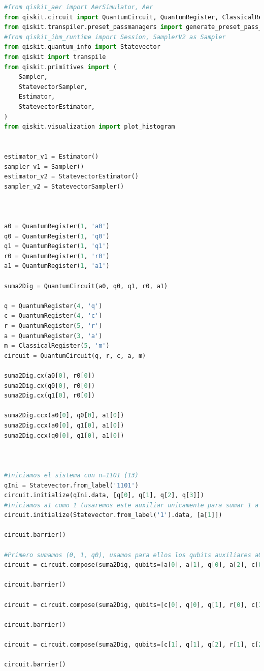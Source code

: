 \begin{lstlisting}[language=Python]
#from qiskit_aer import AerSimulator, Aer
from qiskit.circuit import QuantumCircuit, QuantumRegister, ClassicalRegister
from qiskit.transpiler.preset_passmanagers import generate_preset_pass_manager
#from qiskit_ibm_runtime import Session, SamplerV2 as Sampler
from qiskit.quantum_info import Statevector
from qiskit import transpile
from qiskit.primitives import (
    Sampler,
    StatevectorSampler,
    Estimator,
    StatevectorEstimator,
)
from qiskit.visualization import plot_histogram


estimator_v1 = Estimator()
sampler_v1 = Sampler()
estimator_v2 = StatevectorEstimator()
sampler_v2 = StatevectorSampler()



a0 = QuantumRegister(1, 'a0')
q0 = QuantumRegister(1, 'q0')
q1 = QuantumRegister(1, 'q1')
r0 = QuantumRegister(1, 'r0')
a1 = QuantumRegister(1, 'a1')

suma2Dig = QuantumCircuit(a0, q0, q1, r0, a1)

q = QuantumRegister(4, 'q')
c = QuantumRegister(4, 'c')
r = QuantumRegister(5, 'r')
a = QuantumRegister(3, 'a')
m = ClassicalRegister(5, 'm')
circuit = QuantumCircuit(q, r, c, a, m)

suma2Dig.cx(a0[0], r0[0])
suma2Dig.cx(q0[0], r0[0])
suma2Dig.cx(q1[0], r0[0])

suma2Dig.ccx(a0[0], q0[0], a1[0])
suma2Dig.ccx(a0[0], q1[0], a1[0])
suma2Dig.ccx(q0[0], q1[0], a1[0])



#Iniciamos el sistema con n=1101 (13)
qIni = Statevector.from_label('1101')
circuit.initialize(qIni.data, [q[0], q[1], q[2], q[3]])
#Iniciamos a1 como 1 (usaremos este auxiliar unicamente para sumar 1 a q0 inicialmente). Esto se puede optimizar
circuit.initialize(Statevector.from_label('1').data, [a[1]])

circuit.barrier()

#Primero sumamos (0, 1, q0), usamos para ellos los qubits auxiliares a0 y a1 (establecidos en )
circuit = circuit.compose(suma2Dig, qubits=[a[0], a[1], q[0], a[2], c[0]])

circuit.barrier()

circuit = circuit.compose(suma2Dig, qubits=[c[0], q[0], q[1], r[0], c[1]])

circuit.barrier()

circuit = circuit.compose(suma2Dig, qubits=[c[1], q[1], q[2], r[1], c[2]])

circuit.barrier()


\end{lstlisting}
